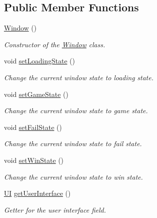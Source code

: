 \subsection*{Public Member Functions}
\begin{DoxyCompactItemize}
\item 
\hyperlink{classwindow_1_1_window_ac92fd9c8fc1bc83c8d8bd8b87eb62213}{Window} ()
\begin{DoxyCompactList}\small\item\em Constructor of the \hyperlink{classwindow_1_1_window}{Window} class. \end{DoxyCompactList}\item 
void \hyperlink{classwindow_1_1_window_a2e2049d1930bb104ec235b0d9ba431fa}{set\-Loading\-State} ()
\begin{DoxyCompactList}\small\item\em Change the current window state to loading state. \end{DoxyCompactList}\item 
void \hyperlink{classwindow_1_1_window_a77e3a4c06b4675bc24eefd91a1faaf11}{set\-Game\-State} ()
\begin{DoxyCompactList}\small\item\em Change the current window state to game state. \end{DoxyCompactList}\item 
void \hyperlink{classwindow_1_1_window_aa14be01e068317ed09bcbc6d12d8a365}{set\-Fail\-State} ()
\begin{DoxyCompactList}\small\item\em Change the current window state to fail state. \end{DoxyCompactList}\item 
void \hyperlink{classwindow_1_1_window_afc31496382fd285df057838b1e38d1c6}{set\-Win\-State} ()
\begin{DoxyCompactList}\small\item\em Change the current window state to win state. \end{DoxyCompactList}\item 
\hyperlink{classwindow_1_1ui_1_1_u_i}{U\-I} \hyperlink{classwindow_1_1_window_aab7fb1a0a97c03ddf4e94c5146d4c692}{get\-User\-Interface} ()
\begin{DoxyCompactList}\small\item\em Getter for the user interface field. \end{DoxyCompactList}\end{DoxyCompactItemize}
